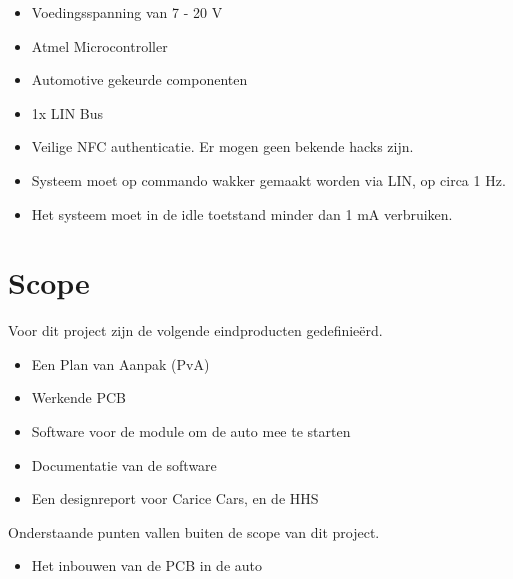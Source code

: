 \begin{itemize}
	\item Voedingsspanning van 7 - 20 V
	\item Atmel Microcontroller
	\item Automotive gekeurde componenten
	\item 1x LIN Bus
	\item Veilige NFC authenticatie. Er mogen geen bekende hacks zijn.
	\item Systeem moet op commando wakker gemaakt worden via LIN, op circa 1 Hz.
	\item Het systeem moet in de idle toetstand minder dan 1 mA verbruiken.
\end{itemize}


\section{Scope}

Voor dit project zijn de volgende eindproducten gedefinieërd.
\begin{itemize}
	\item Een Plan van Aanpak (PvA)
	\item Werkende PCB
	\item Software voor de module om de auto mee te starten
	\item Documentatie van de software
	\item Een designreport voor Carice Cars, en de HHS
\end{itemize}

Onderstaande punten vallen buiten de scope van dit project.

\begin{itemize}
	\item Het inbouwen van de PCB in de auto
\end{itemize}
